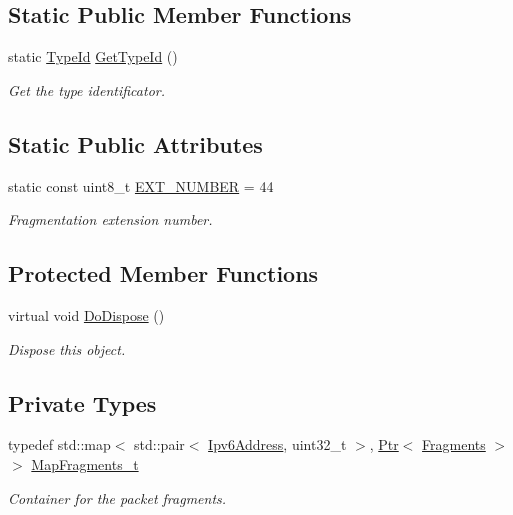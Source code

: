 \subsection*{Static Public Member Functions}
\begin{DoxyCompactItemize}
\item 
static \hyperlink{classns3_1_1TypeId}{Type\+Id} \hyperlink{classns3_1_1Ipv6ExtensionFragment_a4feb01a4a730944516ac8defa19877fd}{Get\+Type\+Id} ()
\begin{DoxyCompactList}\small\item\em Get the type identificator. \end{DoxyCompactList}\end{DoxyCompactItemize}
\subsection*{Static Public Attributes}
\begin{DoxyCompactItemize}
\item 
static const uint8\+\_\+t \hyperlink{classns3_1_1Ipv6ExtensionFragment_ae87f2248d10cdb25e8e082fa74049425}{E\+X\+T\+\_\+\+N\+U\+M\+B\+ER} = 44
\begin{DoxyCompactList}\small\item\em Fragmentation extension number. \end{DoxyCompactList}\end{DoxyCompactItemize}
\subsection*{Protected Member Functions}
\begin{DoxyCompactItemize}
\item 
virtual void \hyperlink{classns3_1_1Ipv6ExtensionFragment_a73457903e06c1f12727974f977ea667c}{Do\+Dispose} ()
\begin{DoxyCompactList}\small\item\em Dispose this object. \end{DoxyCompactList}\end{DoxyCompactItemize}
\subsection*{Private Types}
\begin{DoxyCompactItemize}
\item 
typedef std\+::map$<$ std\+::pair$<$ \hyperlink{classns3_1_1Ipv6Address}{Ipv6\+Address}, uint32\+\_\+t $>$, \hyperlink{classns3_1_1Ptr}{Ptr}$<$ \hyperlink{classns3_1_1Ipv6ExtensionFragment_1_1Fragments}{Fragments} $>$ $>$ \hyperlink{classns3_1_1Ipv6ExtensionFragment_a6d425bc0c4a0fe492883dfd93d73881d}{Map\+Fragments\+\_\+t}
\begin{DoxyCompactList}\small\item\em Container for the packet fragments. \end{DoxyCompactList}\end{DoxyCompactItemize}
